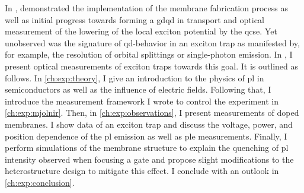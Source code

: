 In , \citeauthor{Descamps2023} demonstrated the implementation of the membrane fabrication process as well as initial progress towards forming a \gls{gdqd} in transport and optical measurement of the lowering of the local exciton potential by the \gls{qcse}.
Yet unobserved was the signature of \gls{qd}-behavior in an exciton trap as manifested by, for example, the resolution of orbital splittings or single-photon emission.
In \thispart, I present optical measurements of exciton traps towards this goal.
It is outlined as follows.
In \cref{ch:exp:theory}, I give an introduction to the physics of \gls{pl} in semiconductors as well as the influence of electric fields.
Following that, I introduce the \python measurement framework I wrote to control the experiment in \cref{ch:exp:mjolnir}.
Then, in \cref{ch:exp:observations}, I present measurements of doped membranes.
I show data of an exciton trap and discuss the voltage, power, and position dependence of the \gls{pl} emission as well as \gls{ple} measurements.
Finally, I perform simulations of the membrane structure to explain the quenching of \gls{pl} intensity observed when focusing a gate and propose slight modifications to the heterostructure design to mitigate this effect.
I conclude with an outlook in \cref{ch:exp:conclusion}.
